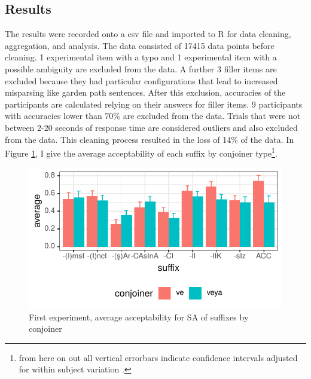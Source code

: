 \subsection{Results}

The results were recorded onto a csv file and imported to R \citep{team2013r} for data cleaning, aggregation, and analysis. The data consisted of 17415 data points before cleaning. 1 experimental item with a typo and 1 experimental item with a possible ambiguity are excluded from the data. A further 3 filler items are excluded because they had particular configurations that lead to increased misparsing like garden path sentences. After this exclusion, accuracies of the participants are calculated relying on their answers for filler items. 9 participants with accuracies lower than 70\% are excluded from the data. Trials that were not between 2-20 seconds of response time are considered outliers and also excluded from the data. This cleaning process resulted in the loss of 14\% of the data. In Figure \ref{fig:suffixacceptability}, I give the average acceptability of each suffix by conjoiner type\footnote{from here on out all vertical errorbars indicate confidence intervals adjusted for within subject variation \citep{cousineau2017varieties}.}.

\begin{knitrout}
\color{fgcolor}\begin{figure}[hbt!]

{\centering \includegraphics[]{experiments/acceptability/report/figure/suffixacceptability-1.pdf} 

}

\caption[First experiment, average acceptability for SA of suffixes by conjoiner]{First experiment, average acceptability for SA of suffixes by conjoiner}\label{fig:suffixacceptability}
\end{figure}


\end{knitrout}

